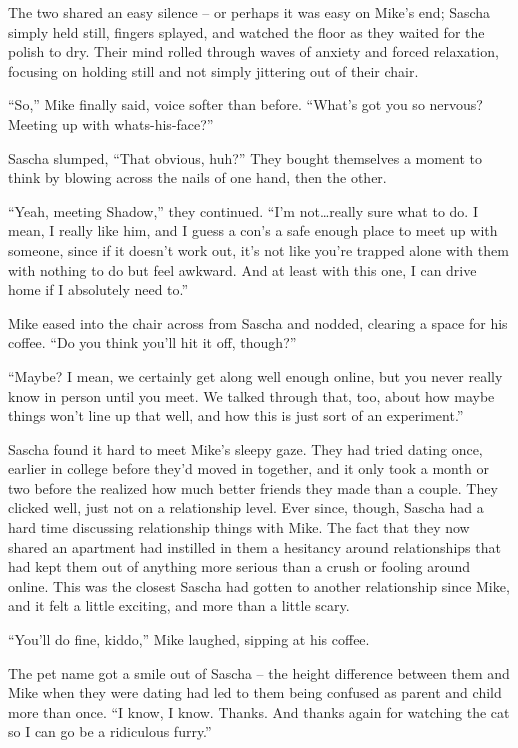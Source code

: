 \documentclass[12pt,letterpaper,oneside]{memoir}
\begin{document}
  The two shared an easy silence -- or perhaps it was easy on Mike's end; Sascha simply held still, fingers splayed, and watched the floor as they waited for the polish to dry. Their mind rolled through waves of anxiety and forced relaxation, focusing on holding still and not simply jittering out of their chair.

  ``So,'' Mike finally said, voice softer than before. ``What's got you so nervous? Meeting up with whats-his-face?''

  Sascha slumped, ``That obvious, huh?'' They bought themselves a moment to think by blowing across the nails of one hand, then the other.

  ``Yeah, meeting Shadow,'' they continued. ``I'm not\ldots{}really sure what to do. I mean, I really like him, and I guess a con's a safe enough place to meet up with someone, since if it doesn't work out, it's not like you're trapped alone with them with nothing to do but feel awkward. And at least with this one, I can drive home if I absolutely need to.''

  Mike eased into the chair across from Sascha and nodded, clearing a space for his coffee. ``Do you think you'll hit it off, though?''

  ``Maybe? I mean, we certainly get along well enough online, but you never really know in person until you meet. We talked through that, too, about how maybe things won't line up that well, and how this is just sort of an experiment.''

  Sascha found it hard to meet Mike's sleepy gaze. They had tried dating once, earlier in college before they'd moved in together, and it only took a month or two before the realized how much better friends they made than a couple. They clicked well, just not on a relationship level. Ever since, though, Sascha had a hard time discussing relationship things with Mike. The fact that they now shared an apartment had instilled in them a hesitancy around relationships that had kept them out of anything more serious than a crush or fooling around online. This was the closest Sascha had gotten to another relationship since Mike, and it felt a little exciting, and more than a little scary.

  ``You'll do fine, kiddo,'' Mike laughed, sipping at his coffee.

  The pet name got a smile out of Sascha -- the height difference between them and Mike when they were dating had led to them being confused as parent and child more than once. ``I know, I know. Thanks. And thanks again for watching the cat so I can go be a ridiculous furry.''
\end{document}
